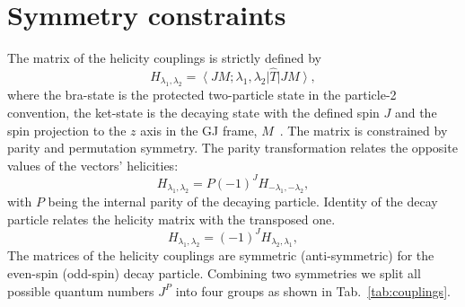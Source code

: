 \documentclass[prd,preprintnumbers,floatfix,
nofootinbib,superscriptaddress]{revtex4}
\newcommand{\ket}[1]{\ensuremath{\left|#1\right\rangle}}
\newcommand{\bra}[1]{\ensuremath{\left\langle #1\right|}}
\begin{document}
%


\section{Symmetry constraints} \label{sec:symmetries}
The matrix of the helicity couplings is strictly defined by
\begin{equation} \label{eq:helicity.def}
  H_{\lambda_1,\lambda_2} = \bra{JM;\lambda_1,\lambda_2}\hat{T}\ket{JM},
\end{equation}
where the bra-state is the protected two-particle state in the particle-2 convention,
the ket-state is the decaying state with the defined spin $J$ and the spin projection to the $z$ axis in the GJ frame, $M$~\cite{Martin:1970xx,Collins:1977jy}.
The matrix is constrained by parity and permutation symmetry.
The parity transformation relates the opposite values of the vectors' helicities:
\begin{equation} \label{eq:parity}
H_{\lambda_1,\lambda_2} = P (-1)^J H_{-\lambda_1,-\lambda_2},
\end{equation}
with $P$ being the internal parity of the decaying particle.
Identity of the decay particle relates the helicity matrix with the transposed one.
\begin{equation} \label{eq:permutation}
H_{\lambda_1,\lambda_2} = (-1)^J H_{\lambda_2,\lambda_1},
\end{equation}
The matrices of the helicity couplings are symmetric (anti-symmetric) for the even-spin (odd-spin) decay particle.
Combining two symmetries we split all possible quantum numbers $J^P$ into four groups as shown in Tab.~\ref{tab:couplings}.
\end{document}
